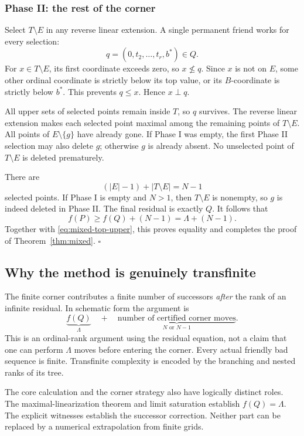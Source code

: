\documentclass[11pt,letterpaper]{article}
\theoremstyle{definition}
\theoremstyle{remark}
\begin{document}
\subsubsection{Phase II: the rest of the corner}
Select $T\setminus E$ in any reverse linear extension. A single permanent
friend works for every selection:
\[
 q=(0,t_2,\ldots,t_r,b^*)\in Q.
\]
For $x\in T\setminus E$, its first coordinate exceeds zero, so
$x\not\le q$. Since $x$ is not on $E$, some other ordinal coordinate is
strictly below its top value, or its $B$-coordinate is strictly below
$b^*$. This prevents $q\le x$. Hence $x\perp q$.

All upper sets of selected points remain inside $T$, so $q$ survives.
The reverse linear extension makes each selected point maximal among the
remaining points of $T\setminus E$. All points of $E\setminus\{g\}$
have already gone. If Phase I was empty, the first Phase II selection may
also delete $g$; otherwise $g$ is already absent. No unselected point of
$T\setminus E$ is deleted prematurely.

There are
\[
 (|E|-1)+|T\setminus E|=N-1
\]
selected points. If Phase I is empty and $N>1$, then $T\setminus E$ is
nonempty, so $g$ is indeed deleted in Phase II. The final residual is
exactly $Q$. It follows that
\[
 f(P)\ge f(Q)+(N-1)=\Lambda+(N-1).
\]
Together with \eqref{eq:mixed-top-upper}, this proves equality and completes
the proof of Theorem~\ref{thm:mixed}.
\hfill$\square$

\subsection{Why the method is genuinely transfinite}
The finite corner contributes a finite number of successors \emph{after}
the rank of an infinite residual. In schematic form the argument is
\[
 \underbrace{f(Q)}_{\Lambda}
 \quad+\quad
 \underbrace{\text{number of certified corner moves}}_{N\text{ or }N-1}.
\]
This is an ordinal-rank argument using the residual equation, not a claim
that one can perform $\Lambda$ moves before entering the corner. Every
actual friendly bad sequence is finite. Transfinite complexity is encoded
by the branching and nested ranks of its tree.

The core calculation and the corner strategy also have logically distinct
roles. The maximal-linearization theorem and limit saturation establish
$f(Q)=\Lambda$. The explicit witnesses establish the successor correction.
Neither part can be replaced by a numerical extrapolation from finite
grids.
\end{document}
